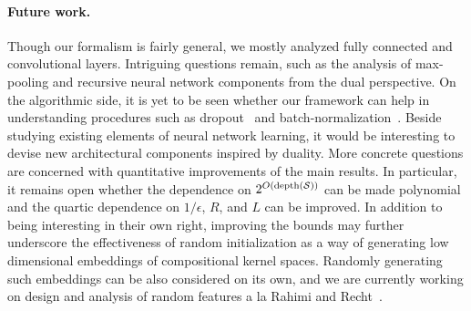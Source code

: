 \paragraph{Future work.} Though our formalism is fairly general, we mostly analyzed
fully connected and convolutional layers. Intriguing
questions remain, such as the analysis of max-pooling and recursive
neural network components from the dual perspective. On the algorithmic side,
it is yet to be seen whether our framework can help in understanding
procedures such as dropout~\cite{srivastava2014dropout} and
batch-normalization~\cite{ioffe2015batch}. Beside studying existing
elements of neural network learning, it would be interesting to devise new
architectural components inspired by duality.
%
More concrete questions are concerned with quantitative improvements of the
main results. In particular, it remains open whether the dependence on
$2^{O\left(\mathrm{depth} ({\cal S})\right)}$ can be made polynomial and the quartic
dependence on $1/\epsilon$, $R$, and $L$ can be improved.  In addition to
being interesting in their own right, improving the bounds may further
underscore the effectiveness of  random initialization as a way of
generating low dimensional embeddings of compositional kernel spaces. Randomly
generating such embeddings can be also considered on its own, and we are
currently working on design and analysis of random features a la
Rahimi and Recht~\cite{RahimiRe07}.
